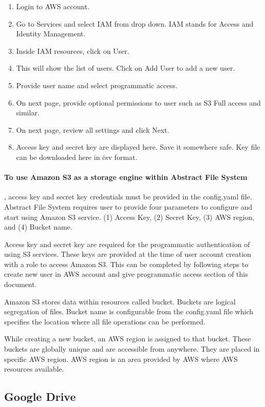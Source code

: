 \begin{enumerate}
    \item Login to AWS account.
    \item Go to Services and select IAM from drop down. 
	IAM stands for Access and Identity Management.
    \item Inside IAM resources, click on User.
    \item This will show the list of users. Click on Add User to add a new 
user.
    \item Provide user name and select programmatic access.
    \item On next page, provide optional permissions to user such as S3 Full
access and similar.
    \item On next page, review all settings and click Next.
    \item Access key and secret key are displayed here. Save it somewhere safe.
Key file can be downloaded here in \.csv format.
\end{enumerate}


\paragraph{To use Amazon S3 as a storage engine within Abstract File
  System}, access key and secret key credentials must be provided in
the config.yaml file. Abstract File System requires user to provide
four parameters to configure and start using Amazon S3 service.  (1)
Access Key, (2) Secret Key, (3) AWS region, and (4) Bucket name.


Access key and secret key are required for the programmatic
authentication of using S3 services. These keys are provided at the
time of user account creation with a role to access Amazon S3.  This
can be completed by following steps to create new user in AWS account
and give programmatic access section of this document.

Amazon S3 stores data within resources called bucket. Buckets are logical
segregation of files. Bucket name is configurable from the config.yaml file
which specifies the location where all file operations can be performed.

While creating a new bucket, an AWS region is assigned to that bucket. These 
buckets are globally unique and are accessible from anywhere. They are
placed in specific AWS region. AWS region is an area provided by AWS where
AWS resources available.

\subsection{Google Drive}

